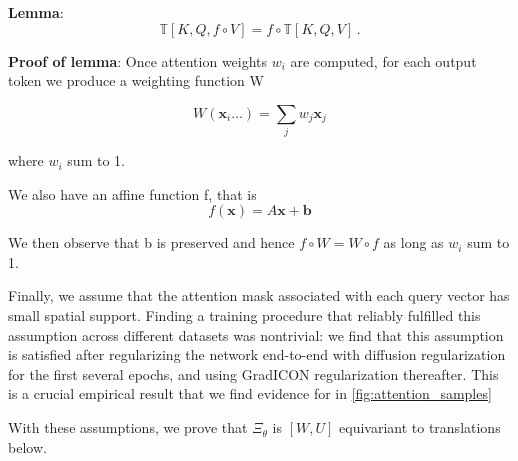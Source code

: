 \textbf{Lemma}:
\begin{equation}\mathbb{T}[K, Q, f\circ V] = f \circ \mathbb{T}[K, Q, V]\,. \label{transaff2}\end{equation}

\textbf{Proof of lemma}: Once attention weights $w_i$ are computed, for each output token we produce a weighting function W

\begin{equation}
    W(\textbf{x}_i \dots) = \sum_j w_j \textbf{x}_j
\end{equation}

where $w_i$ sum to 1.

We also have an affine function f, that is 
\begin{equation}
    f(\textbf{x}) = A\textbf{x} + \textbf{b}
\end{equation}

We then observe that b is preserved and hence $f\circ W = W \circ f$ as long as $w_i$ sum to 1.



Finally, we assume that the attention mask associated with each query vector has small spatial
support. Finding a training procedure that reliably fulfilled this assumption across different datasets was nontrivial: we find that this assumption is satisfied after regularizing the  network end-to-end with diffusion
regularization for the first several epochs, and using GradICON regularization thereafter. This is a crucial empirical result that we find evidence for in \ref{fig:attention_samples}

With these assumptions, we prove that $\Xi_\theta$ is $[W, U]$ equivariant to translations below.


